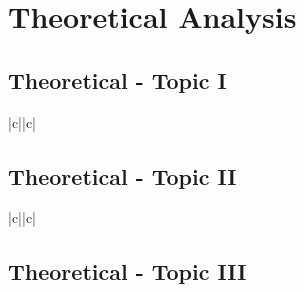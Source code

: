 \section{Theoretical Analysis}
\label{sec:analysis}

\paragraph{}

\subsection{Theoretical - Topic I}
\label{subsec:first_topic}

\begin{center}
   \begin{tabular}{|c||c|}
      \hline    
       {\bf } \\
      \hline
        
   \end{tabular}
 \end{center}


\subsection{Theoretical - Topic II}
\label{subsec:second_topic}


\begin{center}
   \begin{tabular}{|c||c|}
      \hline    
       {\bf } \\
      \hline
        
   \end{tabular}
 \end{center}
 

 
\subsection{Theoretical - Topic III}
\label{subsec:third_topic}

